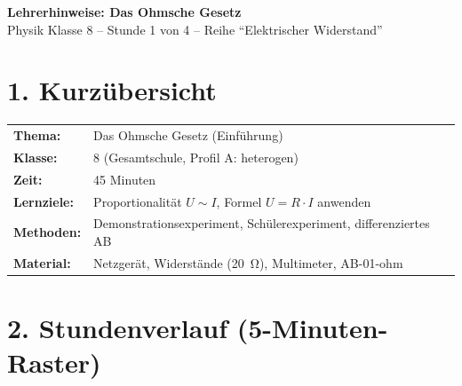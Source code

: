 \documentclass[11pt, a4paper]{article}
\begin{document}

\begin{center}
{\Large\textbf{\textcolor{physik}{Lehrerhinweise: Das Ohmsche Gesetz}}}\\[0.3em]
{\normalsize Physik Klasse 8 -- Stunde 1 von 4 -- Reihe ``Elektrischer Widerstand''}
\end{center}

\vspace{1em}


\section*{1. Kurzübersicht}

\begin{infobox}
\begin{tabular}{ll}
\textbf{Thema:} & Das Ohmsche Gesetz (Einführung) \\
\textbf{Klasse:} & 8 (Gesamtschule, Profil A: heterogen) \\
\textbf{Zeit:} & 45 Minuten \\
\textbf{Lernziele:} & Proportionalität $U \sim I$, Formel $U = R \cdot I$ anwenden \\
\textbf{Methoden:} & Demonstrationsexperiment, Schülerexperiment, differenziertes AB \\
\textbf{Material:} & Netzgerät, Widerstände (\SI{20}{\ohm}), Multimeter, AB-01-ohm \\
\end{tabular}
\end{infobox}


\section*{2. Stundenverlauf (5-Minuten-Raster)}
\end{document}

